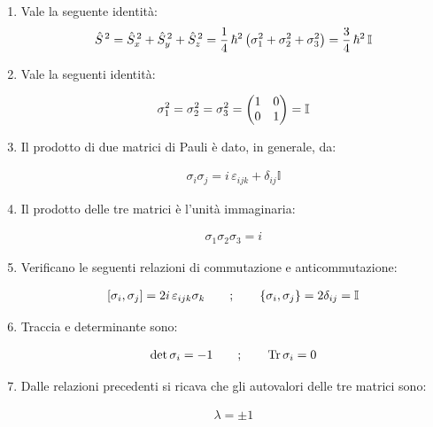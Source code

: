 \begin{enumerate}[label=\arabic*)]

	\item Vale la seguente identità:
	\begin{align*}
		\hat{S}^{\, 2} = \hat{S}^{\, 2}_x + \hat{S}^{\, 2}_y + \hat{S}^{\, 2}_z = \frac{1}{4} \, \hbar^2 \, \qty(\sigma_1^2 + \sigma_2^2 + \sigma_3^2 ) = \frac{3}{4} \, \hbar^2 \, \mathbb{I}
	\end{align*}
	
	\item Vale la seguenti identità:
	
	\begin{align*}
		\sigma_1^{2} = \sigma_2^{2} = \sigma_3^2 = \mqty( 1 & 0 \\ 0 & 1 )  = \mathbb{I}
	\end{align*}
	
	\item Il prodotto di due matrici di Pauli è dato, in generale, da:
	
	\begin{align*}
		\sigma_i \sigma_j = i \, \varepsilon_{ijk} + \delta_{ij} \mathbb{I}
	\end{align*}
	
	\item Il prodotto delle tre matrici è l'unità immaginaria:
	
	\begin{align*}
		\sigma_1 \sigma_2 \sigma_3 = i
	\end{align*}

	\item Verificano le seguenti relazioni di commutazione e anticommutazione:
	
	\begin{align*}
		\qty[\sigma_i, \sigma_j] = 2 i \, \varepsilon_{ijk} \sigma_k \qquad ; \qquad \qty{\sigma_i, \sigma_j} = 2 \delta_{ij} = \mathbb{I}
	\end{align*}
	
	\item Traccia e determinante sono:
	
	\begin{align*}
		\det \sigma_i = -1 \qquad ; \qquad \Tr \sigma_i = 0
	\end{align*}
	
	\item Dalle relazioni precedenti si ricava che gli autovalori delle tre matrici sono:
	
	\begin{align*}
		\lambda = \pm 1
	\end{align*}
	

\end{enumerate}
